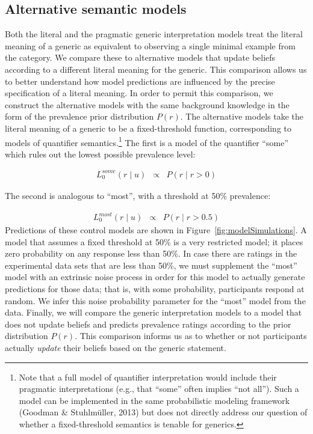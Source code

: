 \documentclass[floatsintext,doc]{apa6}
\let\rmarkdownfootnote\footnote%
\def\footnote{\protect\rmarkdownfootnote}
\begin{document}
\hypertarget{alternative-semantic-models}{%
\subsection{Alternative semantic models}\label{alternative-semantic-models}}

Both the literal and the pragmatic generic interpretation models treat the literal meaning of a generic as equivalent to observing a single minimal example from the category.
We compare these to alternative models that update beliefs according to a different literal meaning for the generic.
This comparison allows us to better understand how model predictions are influenced by the precise specification of a literal meaning.
In order to permit this comparison, we construct the alternative models with the same background knowledge in the form of the prevalence prior distribution \(P(r)\).
The alternative models take the literal meaning of a generic to be a fixed-threshold function, corresponding to models of quantifier semantics.\footnote{Note that a full model of quantifier interpretation would include their pragmatic interpretations (e.g., that \enquote{some} often implies \enquote{not all}). Such a model can be implemented in the same probabilistic modeling framework (Goodman \& Stuhlmüller, 2013) but does not directly address our question of whether a fixed-threshold semantics is tenable for generics.}
The first is a model of the quantifier \enquote{some} which rules out the lowest possible prevalence level:

\begin{eqnarray}
L_0^{some}(r \mid u) &\propto&  P(r \mid r > 0)  \label{eq:someModel}
\end{eqnarray}

The second is analogous to \enquote{most}, with a threshold at 50\% prevalence:

\begin{eqnarray}
L_0^{most}(r \mid u) &\propto&  P(r \mid r > 0.5)  \label{eq:mostModel}
\end{eqnarray}
Predictions of these control models are shown in Figure~\ref{fig:modelSimulations}.
A model that assumes a fixed threshold at 50\% is a very restricted model; it places zero probability on any response less than 50\%.
In case there are ratings in the experimental data sets that are less than 50\%, we must supplement the \enquote{most} model with an extrinsic noise process in order for this model to actually generate predictions for those data; that is, with some probability, participants respond at random.
We infer this noise probability parameter for the \enquote{most} model from the data.
Finally, we will compare the generic interpretation models to a model that does not update beliefs and predicts prevalence ratings according to the prior distribution \(P(r)\).
This comparison informs us as to whether or not participants actually \emph{update} their beliefs based on the generic statement.
\end{document}
